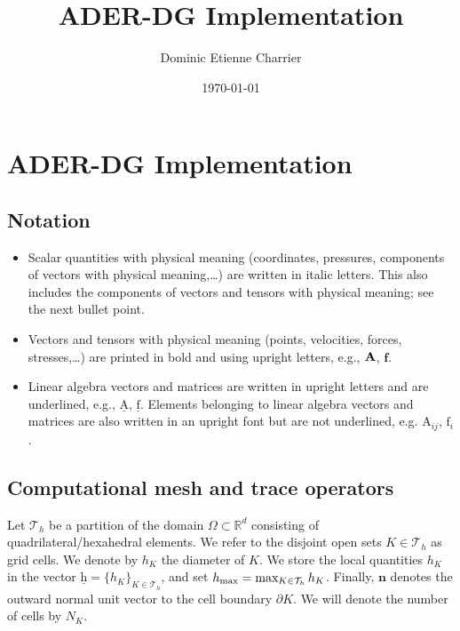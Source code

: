 \documentclass{scrreprt}
\newcommand{\partialup}{\partial}
\theoremstyle{definition}
\theoremstyle{nonumberplain}
\renewcommand{\vec}[1]{{\textbf{#1}}}
\newcommand{\mat}[1]{{\textbf #1}}
\newcommand{\laVec}[1]{\underline{\mathrm{#1}}}
\newcommand{\laVecel}[1]{\mathrm{#1}}
\newcommand{\laMat}[1]{\underline{\mathrm{#1}}}
\newcommand{\laMatel}[1]{\mathrm{#1}}
\newcommand{\domain}{\Omega}
\newcommand{\normal}{\vec{n}}
\newcommand{\tria}{\mathcal{T}_h}
\newcommand{\cell}{K}
\newcommand{\Ncell}{{N_{\cell}}}
\newcommand{\cellBnd}{{\partialup\cell}}
\newcommand{\hcell}{h_\cell}
\begin{document}
\title{ADER-DG Implementation}
\author{Dominic Etienne Charrier}
\date{\today}
\maketitle

\chapter{ADER-DG Implementation}
\section{Notation}
\begin{itemize}
  \item Scalar quantities with physical meaning (coordinates, pressures,
  components of vectors with physical meaning,\ldots) are written in italic
  letters.
  This also includes the components of vectors and tensors with physical meaning;
  see the next bullet point.
  \item Vectors and tensors with physical meaning (points, velocities, forces,
  stresses,\ldots) are printed in bold and using upright letters, e.g.,
  $\mat{A}$, $\vec{f}$.
  \item Linear algebra vectors and matrices are written in upright letters
  and are underlined, e.g., $\laMat{A}$, $\laVec{f}$. Elements belonging to
  linear algebra vectors and matrices
  are also written in an upright font but are not underlined, e.g.
  $\laMatel{A}_{ij}$, $\laVecel{f}_i$.
\end{itemize}
\section{Computational mesh and trace operators}
\label{sec:mesh}
Let $\tria$ be a partition of the domain
$\domain\subset\mathbb{R}^d$ consisting of quadrilateral/hexahedral elements.
We refer to the disjoint open sets $\cell \in \tria$ as grid cells. We denote by
$\hcell$ the diameter of $\cell$.
We store the local quantities $\hcell$ in the vector
$\laVec{h} = \{ \hcell \}_{\cell \in \tria}$, and
set
$h_\textup{max} = \text{max}_{\cell \in \tria }\,\hcell$.
Finally, $\normal$ denotes the outward normal unit vector to the cell boundary
$\cellBnd$. We will denote the number of cells by $\Ncell$.
\end{document}
